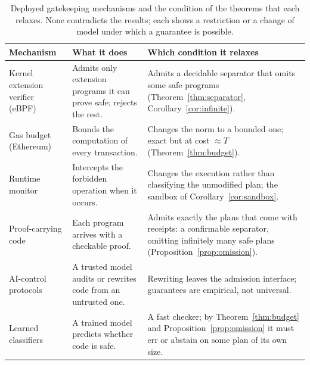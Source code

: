 \begin{table}[t]
\centering\small
\caption{Deployed gatekeeping mechanisms and the condition of the theorems that each relaxes. None contradicts the results; each shows a restriction or a change of model under which a guarantee is possible.}
\label{tab:mechanisms}
\begin{tabularx}{\textwidth}{>{\raggedright\arraybackslash}p{3.4cm}YY}
\toprule
Mechanism & What it does & Which condition it relaxes\\
\midrule
Kernel extension verifier (eBPF) \cite{gershuni} & Admits only extension programs it can prove safe; rejects the rest. & Admits a decidable separator that omits some safe programs (Theorem~\ref{thm:separator}, Corollary~\ref{cor:infinite}).\\
Gas budget (Ethereum) \cite{wood} & Bounds the computation of every transaction. & Changes the norm to a bounded one; exact but at cost $\approx T$ (Theorem~\ref{thm:budget}).\\
Runtime monitor \cite{schneider,ligatti} & Intercepts the forbidden operation when it occurs. & Changes the execution rather than classifying the unmodified plan; the sandbox of Corollary~\ref{cor:sandbox}.\\
Proof-carrying code \cite{necula} & Each program arrives with a checkable proof. & Admits exactly the plans that come with receipts: a confirmable separator, omitting infinitely many safe plans (Proposition~\ref{prop:omission}).\\
AI-control protocols \cite{greenblatt} & A trusted model audits or rewrites code from an untrusted one. & Rewriting leaves the admission interface; guarantees are empirical, not universal.\\
Learned classifiers & A trained model predicts whether code is safe. & A fast checker; by Theorem~\ref{thm:budget} and Proposition~\ref{prop:omission} it must err or abstain on some plan of its own size.\\
\bottomrule
\end{tabularx}
\end{table}
